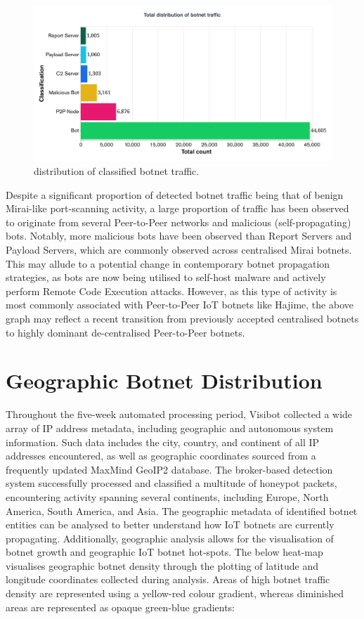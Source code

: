 \begin{figure}[!htb]
    \centering
    \includegraphics[width=0.75\linewidth]{results/botnet_distribution_histogram.png}
    \caption{distribution of classified botnet traffic.}
    \label{fig:botnet_distribution} 
\end{figure}

\newpage

Despite a significant proportion of detected botnet traffic being that of benign Mirai-like port-scanning activity, a large proportion of traffic has been observed to originate from several Peer-to-Peer networks and malicious (self-propagating) bots. Notably, more malicious bots have been observed than Report Servers and Payload Servers, which are commonly observed across centralised Mirai botnets. This may allude to a potential change in contemporary botnet propagation strategies, as bots are now being utilised to self-host malware and actively perform Remote Code Execution attacks. However, as this type of activity is most commonly associated with Peer-to-Peer IoT botnets like Hajime, the above graph may reflect a recent transition from previously accepted centralised botnets to highly dominant de-centralised Peer-to-Peer botnets.

\section{Geographic Botnet Distribution}

Throughout the five-week automated processing period, Visibot collected a wide array of IP address metadata, including geographic and autonomous system information. Such data includes the city, country, and continent of all IP addresses encountered, as well as geographic coordinates sourced from a frequently updated MaxMind GeoIP2 database. The broker-based detection system successfully processed and classified a multitude of honeypot packets, encountering activity spanning several continents, including Europe, North America, South America, and Asia. The geographic metadata of identified botnet entities can be analysed to better understand how IoT botnets are currently propagating. Additionally, geographic analysis allows for the visualisation of botnet growth and geographic IoT botnet hot-spots. The below heat-map visualises geographic botnet density through the plotting of latitude and longitude coordinates collected during analysis. Areas of high botnet traffic density are represented using a yellow-red colour gradient, whereas diminished areas are represented as opaque green-blue gradients:

